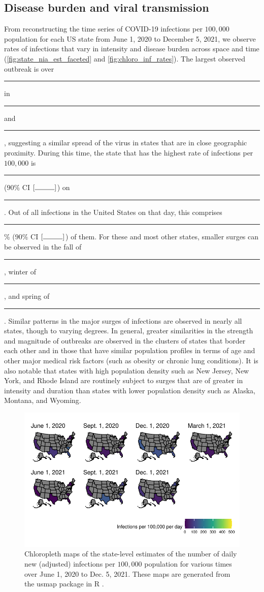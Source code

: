 \documentclass{article}
\begin{document}
\subsection{Disease burden and viral transmission}
From reconstructing the time series of COVID-19 infections per $100,000$ population for each US state from June 1, 2020 to December 5, 2021, we observe rates of infections that vary in intensity and disease burden across space and time (\autoref{fig:state_nia_est_faceted} and \autoref{fig:chloro_inf_rates}). The largest observed outbreak is over \rule{1cm}{0.15mm} in \rule{1cm}{0.15mm} and \rule{1cm}{0.15mm}, suggesting a similar spread of the virus in states that are in close geographic proximity. During this time, the state that has the highest rate of infections per $100,000$ is \rule{1cm}{0.15mm} ($90\%$ CI $[\rule{1cm}{0.15mm}]$) on \rule{1cm}{0.15mm}. Out of all infections in the United States on that day, this comprises \rule{1cm}{0.15mm}\% ($90\%$ CI $[\rule{1cm}{0.15mm}]$) of them. For these and most other states, smaller surges can be observed in the fall of \rule{1cm}{0.15mm}, winter of \rule{1cm}{0.15mm}, and spring of \rule{1cm}{0.15mm}. Similar patterns in the major surges of infections are observed in nearly all states, though to varying degrees. In general, greater similarities in the strength and magnitude of outbreaks are observed in the clusters of states that border each other and in those that have similar population profiles in terms of age and other major medical risk factors (such as obesity or chronic lung conditions). It is also notable that states with high population density such as New Jersey, New York, and Rhode Island are routinely subject to surges that are of greater in intensity and duration than states with lower population density such as Alaska, Montana, and Wyoming. %

\begin{figure}[!tb]
\centering
    \includegraphics[width=.99\textwidth]{chloro_inf_rates.pdf}
    \caption{Chloropleth maps of the state-level estimates of the number of daily new (adjusted) infections per $100,000$ population for various times over June 1, 2020 to Dec. 5, 2021. These maps are generated from the usmap package in R \citep{lorenzo2023usmap}.} 
    \label{fig:chloro_inf_rates}
\end{figure}
\end{document}
